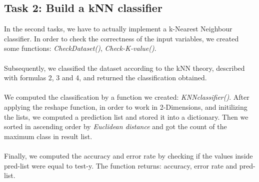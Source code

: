 \documentclass[10pt]{article}
\begin{document}
\subsection{Task 2: Build a kNN classifier}
In the second tasks, we have to actually implement a k-Nearest Neighbour classifier. In order to check the correctness of the input variables, we created some functions: \textit{CheckDataset()}, \textit{Check-K-value()}.
\\\\
Subsequently, we classified the dataset
according to the kNN theory, described with formulas 2, 3 and 4, and returned the classification obtained.
\\\\
We computed the classification by a function we created: \textit{KNNclassifier()}. After applying the reshape function, in order to work in 2-Dimensions, and initilizing the lists, we computed a prediction list and stored it into a dictionary. Then we sorted in ascending order by \textit{Euclidean distance} and got the count of the maximum class in result list.
\\\\
Finally, we computed the accuracy and error rate by checking if the values inside pred-list were equal to test-y.
The function returns: accuracy, error rate and pred-list.
\end{document}
